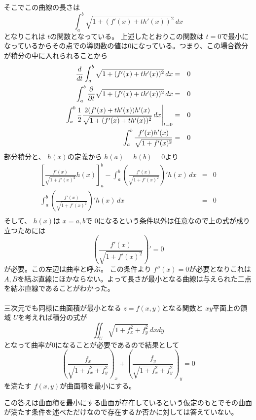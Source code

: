 \documentclass[dvipdfmx]{jsarticle}
\begin{document}
\begin{multicols}{2}
    そこでこの曲線の長さは
    \[
    \int_a^b \sqrt{1 + (f'(x) + th'(x))^2} \, dx
    \]
    となりこれは $t$の関数となっている。
    上述したとおりこの関数は $t = 0$で最小になっているからその点での導関数の値は0になっている。つまり、この場合微分が積分の中に入れられることから
    \begin{eqnarray*}
      \frac{d}{dt}\int_a^b \sqrt{1 + (f'(x) + th'(x))^2} \, dx & = & 0 \\
      \int_a^b \frac{\partial }{\partial t} \sqrt{1 + (f'(x) + th'(x))^2} \, dx & = & 0 \\
      \left. \int_a^b \frac{1}{2} \frac{2(f'(x) + th'(x))h'(x)}{\sqrt{1 + (f'(x) + th'(x))^2}} \, dx \right|_{t = 0} & = & 0 \\
      \int_a^b \frac{f'(x) h'(x)}{\sqrt{1 + f'(x)^2}} & = & 0
    \end{eqnarray*}
    部分積分と、 $h(x)$の定義から $h(a) = h(b) = 0$より
    \begin{eqnarray*}
      \left[ \frac{f'(x)}{\sqrt{1 + f'(x)^2}} h(x) \right]_a^b - \int_a^b \left( \frac{f'(x)}{\sqrt{1 + f'(x)^2}} \right)' h(x) \, dx & = & 0 \\
      \int_a^b \left( \frac{f'(x)}{\sqrt{1 + f'(x)^2}} \right)' h(x) \, dx & = & 0 \\
    \end{eqnarray*}
    そして、 $h(x)$は $x = a,b$で $0$になるという条件以外は任意なので上の式が成り立つためには
    \[
    \left( \frac{f'(x)}{\sqrt{1 + f'(x)^2}} \right)' = 0
    \]
    が必要。この左辺は曲率と呼ぶ。
    この条件より $f''(x) = 0$が必要となりこれは $A,B$を結ぶ直線にほかならない。よって長さが最小となる曲線は与えられた二点を結ぶ直線であることがわかった。
    \\
    \\
    三次元でも同様に曲面積が最小となる $z = f(x,y)$となる関数と $xy$平面上の領域 $U$を考えれば積分の式が
    \[
    \iint_U \sqrt{1 + f_x^2 + f_y^2} \, dxdy
    \]
    となって曲率が0になることが必要であるので結果として
    \[
    \left( \frac{f_x}{\sqrt{1 + f_x^2 + f_y^2}} \right)_x + \left( \frac{f_y}{\sqrt{1 + f_x^2 + f_y^2}} \right)_y = 0
    \]
    を満たす $f(x,y)$が曲面積を最小にする。

    この答えは曲面積を最小にする曲面が存在しているという仮定のもとでその曲面が満たす条件を述べただけなので存在するか否かに対しては答えていない。
    \clearpage
\end{multicols}
\end{document}
